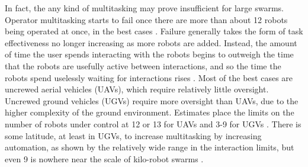\documentclass[]{article}
\begin{document}
In fact, the any kind of multitasking may prove insufficient for large swarms. 
Operator multitasking starts to fail once there are more than about 12 robots being operated at once, in the best cases .
Failure generally takes the form of task effectiveness no longer increasing as more robots are added.
Instead, the amount of time the user spends interacting with the robots begins to outweigh the time that the robots are usefully active between interactions, and so the time the robots spend uselessly waiting for interactions rises . 
Most of the best cases are uncrewed aerial vehicles (UAVs), which require relatively little oversight. 
Uncrewed ground vehicles (UGVs) require more oversight than UAVs, due to the higher complexity of the ground environment. 
Estimates place the limits on the number of robots under control at 12 or 13 for UAVs and 3-9 for UGVs \cite{WangSearchScale}.  
There is some latitude, at least in UGVs, to increase multitasking by increasing automation, as shown by the relatively wide range in the interaction limits, but even 9 is nowhere near the scale of kilo-robot swarms \cite{Olsen:2004:FMH:985692.985722}.
\end{document}
